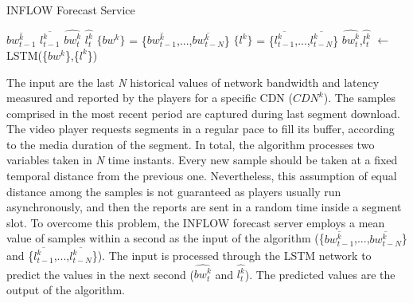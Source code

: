 \begin{algorithm}
	\renewcommand{\algorithmicrequire}{\textbf{Input:}}
	\renewcommand{\algorithmicensure}{\textbf{Output:}}
	\caption{INFLOW Forecast Service}
	\label{alg:IEEETBC2020algorithmForecast}
	\begin{algorithmic}
		\State {}
		\Require $\overline{bw_{t-1}^{k}}$ 
		\Require $\overline{l_{t-1}^{k}}$ 
		\Ensure $\widehat{{bw}_{t}^{k}}$ 
		\Ensure $\widehat{{l}_{t}^{k}}$ 
		\State $\{bw^{k}\}$ = \{$\overline{bw_{t-1}^{k}}$,...,$\overline{bw_{t-N}^{k}}$\} 
		\State $\{l^{k}\}$ = \{$\overline{l_{t-1}^{k}}$,...,$\overline{l_{t-N}^{k}}$\} 
		\State $\widehat{{bw}_{t}^{k}}$,$\widehat{{l}_{t}^{k}}$ $\leftarrow$ LSTM(\{$bw^{k}$\},\{$l^{k}$\}) 
		\EndFunction
	\end{algorithmic}
\end{algorithm}

The input are the last \textit{N} historical values of network bandwidth and latency measured and reported by the players for a specific CDN ($CDN^{k}$). The samples comprised in the most recent period are captured during last segment download. The video player requests segments in a regular pace to fill its buffer, according to the media duration of the segment. In total, the algorithm processes two variables taken in \textit{N} time instants. Every new sample should be taken at a fixed temporal distance from the previous one. Nevertheless, this assumption of equal distance among the samples is not guaranteed as players usually run asynchronously, and then the reports are sent in a random time inside a segment slot. To overcome this problem, the INFLOW forecast server employs a mean value of samples within a second as the input of the algorithm (\{$\overline{bw_{t-1}^{k}}$,...,$\overline{bw_{t-N}^{k}}$\} and \{$\overline{l_{t-1}^{k}}$,...,$\overline{l_{t-N}^{k}}$\}). The input is processed through the LSTM network to predict the values in the next second ($\widehat{{bw}_{t}^{k}}$ and $\widehat{{l}_{t}^{k}}$). The predicted values are the output of the algorithm.

